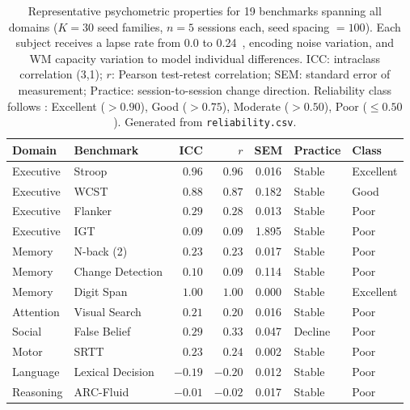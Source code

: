 \documentclass[11pt,letterpaper]{article}
\begin{document}
\begin{table}[t]
\centering
\caption{Representative psychometric properties for 19 benchmarks spanning all domains ($K = 30$ seed families, $n = 5$ sessions each, seed spacing $= 100$). Each subject receives a lapse rate from 0.0 to 0.24~\citep{wichmann2001psychometric}, encoding noise variation, and WM capacity variation to model individual differences. ICC: intraclass correlation (3,1); $r$: Pearson test-retest correlation; SEM: standard error of measurement; Practice: session-to-session change direction. Reliability class follows \citet{cicchetti1994guidelines}: Excellent ($> 0.90$), Good ($> 0.75$), Moderate ($> 0.50$), Poor ($\leq 0.50$). Generated from \texttt{reliability.csv}.}
\label{tab:psychometrics}
\small
\begin{tabular}{@{}llrrcll@{}}
\toprule
\textbf{Domain} & \textbf{Benchmark} & \textbf{ICC} & \textbf{$r$} & \textbf{SEM} & \textbf{Practice} & \textbf{Class} \\
\midrule
Executive     & Stroop             &  $\mathbf{0.96}$ &  $\mathbf{0.96}$ & 0.016 & Stable      & Excellent \\
Executive     & WCST               &  $\mathbf{0.88}$ &  $\mathbf{0.87}$ & 0.182 & Stable      & Good \\
Executive     & Flanker            &  $0.29$ &  $0.28$ & 0.013 & Stable      & Poor \\
Executive     & IGT                &  $0.09$ &  $0.09$ & 1.895 & Stable      & Poor \\
Memory        & N-back (2)         &  $0.23$ &  $0.23$ & 0.017 & Stable      & Poor \\
Memory        & Change Detection   &  $0.10$ &  $0.09$ & 0.114 & Stable      & Poor \\
Memory        & Digit Span         &  $\mathbf{1.00}$ &  $\mathbf{1.00}$ & 0.000 & Stable      & Excellent \\
Attention     & Visual Search      &  $0.21$ &  $0.20$ & 0.016 & Stable      & Poor \\
Social        & False Belief       &  $0.29$ &  $0.33$ & 0.047 & Decline     & Poor \\
Motor         & SRTT               &  $0.23$ &  $0.24$ & 0.002 & Stable      & Poor \\
Language      & Lexical Decision   & $-0.19$ & $-0.20$ & 0.012 & Stable      & Poor \\
Reasoning     & ARC-Fluid          & $-0.01$ & $-0.02$ & 0.017 & Stable      & Poor \\

\end{tabular}
\end{table}
\end{document}
